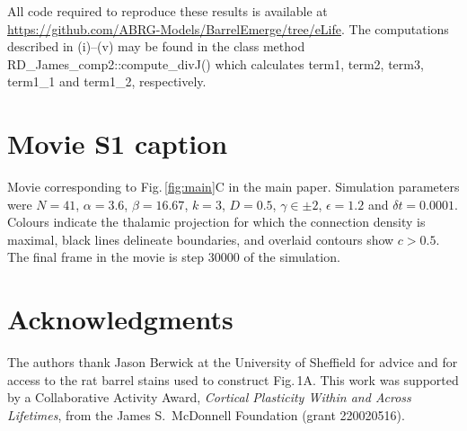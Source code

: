 \documentclass[9pt,lineno]{elife}
\newcommand{\MPtwo}[1]{\textcolor{revblue}{#1}}
\newcommand{\code}[1]{\textsf{#1}}
\begin{document}
All code required to reproduce these results is available at
\url{https://github.com/ABRG-Models/BarrelEmerge/tree/eLife}. The computations
described in (i)--(v) may be found in the class method
\code{RD\_James\MPtwo{\_comp2}::compute\_divJ()} which calculates \code{term1},
\code{term2}, \code{term3}, \code{term1\_1} and \code{term1\_2}, respectively.

\section{Movie S1 caption}

Movie corresponding to Fig.\,\ref{fig:main}C in the main paper. Simulation parameters were
$N=41$, $\alpha=3.6$, $\beta=16.67$, $k=3$, $D=0.5$, $\gamma\in\pm 2$,
$\epsilon=1.2$ and $\delta{t}=0.0001$. Colours indicate the thalamic
projection for which the connection density is maximal, black lines delineate
boundaries, and overlaid contours show $c>0.5$. The final frame in the movie
is step 30000 of the simulation.

\section{Acknowledgments}

The authors thank Jason Berwick at the University of Sheffield for advice and
for access to the rat barrel stains used to construct Fig.\,1A. This work was
supported by a Collaborative Activity Award, \emph{Cortical Plasticity Within
  and Across Lifetimes}, from the James S.~McDonnell Foundation (grant
220020516).


\end{document}

